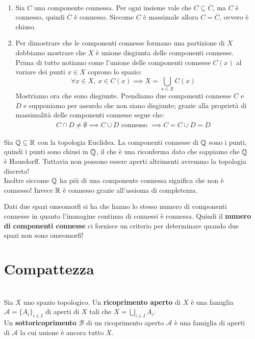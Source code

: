 \begin{demonstration}
	~{}
	\begin{enumerate}[label=\Roman*]
		\item Sia $C$ una componente connessa. Per ogni insieme vale che $C\subseteq\overline{C}$, ma $C$ è connesso, quindi $\overline{C}$ è connesso. Siccome $C$ è massimale allora $C=\overline{C}$, ovvero è chiuso.
		\item Per dimostrare che le componenti connesse formano una partizione di $X$ dobbiamo mostrare che $X$ è unione disgiunta delle componenti connesse. Prima di tutto notiamo come l'unione delle componenti connesse $C\left(x\right)$ al variare dei punti $x\in X$ coprono lo spazio:
			\begin{equation*}
				\forall x\in X,\ x\in C(x) \implies X=\bigcup_{x\in X}C(x)
			\end{equation*}
		Mostriamo ora che sono disgiunte. Prendiamo due componenti connesse $C$ e $D$ e supponiamo per assurdo che non siano disgiunte; grazie alla proprietà di massimalità delle componenti connesse segue che:
		\begin{gather*}
			C\cap D\neq\emptyset \implies C\cup D \text{ connesso } \implies C=C\cup D=D
		\end{gather*}
	\end{enumerate}
\vspace{-6mm}
\end{demonstration}
\begin{example}
	Sia $\mathbb{Q}\subseteq\mathbb{R}$ con la topologia Euclidea. La componenti connesse di $\mathbb{Q}$ sono i punti, quindi i punti sono chiusi in $\mathbb{Q}$, il che è una riconferma dato che sappiamo che $\mathbb{Q}$ è Hausdorff. Tuttavia non possono essere aperti altrimenti avremmo la topologia discreta!\\
	Inoltre siccome $\mathbb{Q}$ ha più di una componente connessa significa che non è connesso! Invece $\mathbb{R}$ è connesso grazie all'assioma di completezza.
\end{example}
\begin{observe}
	Dati due spazi omeomorfi si ha che hanno lo stesso numero di componenti connesse in quanto l'immagine continua di connessi è connessa. Quindi il \textbf{numero di componenti connesse} ci fornisce un criterio per determinare quando due spazi non sono omeomorfi!
\end{observe}


		\section{Compattezza}
\begin{define}~{}\\
	Sia $X$ uno spazio topologico. Un \textbf{ricoprimento aperto} di $X$ è una famiglia $\mathcal{A}=\{A_i \}_{i\in I}$ di aperti di $X$ tali che $X=\bigcup_{i\in I} A_i$. \\
	Un \textbf{sottoricoprimento} $\mathcal{B}$ di un ricoprimento aperto $\mathcal{A}$ è una famiglia di aperti di $\mathcal{A}$ la cui unione è ancora tutto $X$.
\end{define}		

